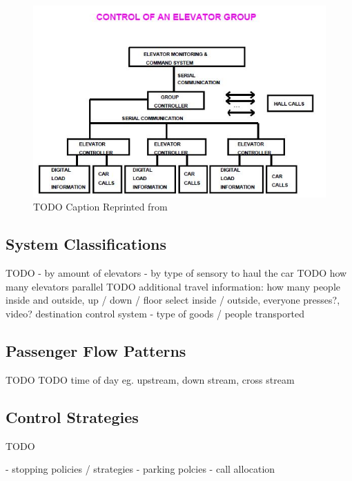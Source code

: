 \begin{figure}
	\centering
	\includegraphics[width=1.0\textwidth, keepaspectratio]{resources/group_controller}
	\caption[]{\label{fig:sota:groupcontroller} TODO Caption
	Reprinted from \textcite[][p.~10]{siikonen1997models}}
\end{figure}



\subsection{System Classifications}
TODO
- by amount of elevators
- by type of sensory to haul the car
TODO how many elevators parallel
TODO additional travel information: how many people inside and outside, up / down / floor select inside / outside, everyone presses?, video? 
destination control system
- type of goods / people transported \autocite[][p.~141]{unger2015aufzuege}

\subsection{Passenger Flow Patterns}
TODO
TODO time of day eg. upstream, down stream, cross stream

\autocite[][pp.~1--2]{beers2015arrivals}
\autocite[][pp.~6--7]{axelsson2013strategies}
\autocite[][p.~194]{unger2015aufzuege}

\subsection{Control Strategies}
TODO

\autocite[][pp.~3--4,10]{beers2015arrivals}
- stopping policies / strategies
- parking polcies
- call allocation

